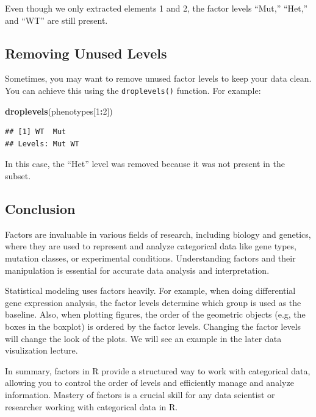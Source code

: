 \documentclass[
]{book}
\newenvironment{Shaded}{\begin{snugshade}}{\end{snugshade}}
\newcommand{\DecValTok}[1]{\textcolor[rgb]{0.00,0.00,0.81}{#1}}
\newcommand{\FunctionTok}[1]{\textcolor[rgb]{0.13,0.29,0.53}{\textbf{#1}}}
\newcommand{\NormalTok}[1]{#1}
\newcommand{\SpecialCharTok}[1]{\textcolor[rgb]{0.81,0.36,0.00}{\textbf{#1}}}
\begin{document}
Even though we only extracted elements 1 and 2, the factor levels ``Mut,'' ``Het,'' and ``WT'' are still present.

\hypertarget{removing-unused-levels}{%
\subsection{Removing Unused Levels}\label{removing-unused-levels}}

Sometimes, you may want to remove unused factor levels to keep your data clean. You can achieve this using the \texttt{droplevels()} function. For example:

\begin{Shaded}
\begin{Highlighting}[]
\FunctionTok{droplevels}\NormalTok{(phenotypes[}\DecValTok{1}\SpecialCharTok{:}\DecValTok{2}\NormalTok{])}
\end{Highlighting}
\end{Shaded}

\begin{verbatim}
## [1] WT  Mut
## Levels: Mut WT
\end{verbatim}

In this case, the ``Het'' level was removed because it was not present in the subset.

\hypertarget{conclusion-17}{%
\subsection{Conclusion}\label{conclusion-17}}

Factors are invaluable in various fields of research, including biology and genetics, where they are used to represent and analyze categorical data like gene types, mutation classes, or experimental conditions. Understanding factors and their manipulation is essential for accurate data analysis and interpretation.

Statistical modeling uses factors heavily. For example, when doing differential gene expression analysis, the factor levels determine which group is used as the baseline. Also, when plotting figures, the order of the geometric objects (e.g, the boxes in the boxplot) is ordered by the factor levels. Changing the factor levels will change the look of the plots. We will see an example in the later data visulization lecture.

In summary, factors in R provide a structured way to work with categorical data, allowing you to control the order of levels and efficiently manage and analyze information. Mastery of factors is a crucial skill for any data scientist or researcher working with categorical data in R.
\end{document}
